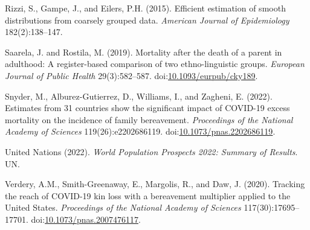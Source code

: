 \documentclass[
  11pt,
  letterpaper,
]{article}
\newlength{\cslhangindent}
\newlength{\cslentryspacingunit} %
\newenvironment{CSLReferences}[2] %
 {%
  \setlength{\parindent}{0pt}
  \ifodd #1
  \let\oldpar\par
  \def\par{\hangindent=\cslhangindent\oldpar}
  \fi
  \setlength{\parskip}{#2\cslentryspacingunit}
 }%
 {}
\begin{document}
\begin{CSLReferences}{1}{0}
\leavevmode{}%
Rizzi, S., Gampe, J., and Eilers, P.H. (2015). Efficient estimation of smooth distributions from coarsely grouped data. \emph{American Journal of Epidemiology} 182(2):138--147.

\leavevmode{}%
Saarela, J. and Rostila, M. (2019). Mortality after the death of a parent in adulthood: A register-based comparison of two ethno-linguistic groups. \emph{European Journal of Public Health} 29(3):582--587. doi:\href{https://doi.org/10.1093/eurpub/cky189}{10.1093/eurpub/cky189}.

\leavevmode{}%
Snyder, M., Alburez-Gutierrez, D., Williams, I., and Zagheni, E. (2022). Estimates from 31 countries show the significant impact of COVID-19 excess mortality on the incidence of family bereavement. \emph{Proceedings of the National Academy of Sciences} 119(26):e2202686119. doi:\href{https://doi.org/10.1073/pnas.2202686119}{10.1073/pnas.2202686119}.

\leavevmode{}%
United Nations (2022). \emph{World Population Prospects 2022: Summary of Results}. UN.

\leavevmode{}%
Verdery, A.M., Smith-Greenaway, E., Margolis, R., and Daw, J. (2020). Tracking the reach of COVID-19 kin loss with a bereavement multiplier applied to the {U}nited {S}tates. \emph{Proceedings of the National Academy of Sciences} 117(30):17695--17701. doi:\href{https://doi.org/10.1073/pnas.2007476117}{10.1073/pnas.2007476117}.

\end{CSLReferences}
\end{document}
